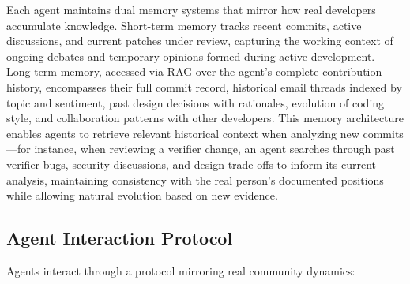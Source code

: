 Each agent maintains dual memory systems that mirror how real developers accumulate knowledge. Short-term memory tracks recent commits, active discussions, and current patches under review, capturing the working context of ongoing debates and temporary opinions formed during active development. Long-term memory, accessed via RAG over the agent's complete contribution history, encompasses their full commit record, historical email threads indexed by topic and sentiment, past design decisions with rationales, evolution of coding style, and collaboration patterns with other developers. This memory architecture enables agents to retrieve relevant historical context when analyzing new commits—for instance, when reviewing a verifier change, an agent searches through past verifier bugs, security discussions, and design trade-offs to inform its current analysis, maintaining consistency with the real person's documented positions while allowing natural evolution based on new evidence.

\subsection{Agent Interaction Protocol}

% 
% 
% 
% 
% 
Agents interact through a protocol mirroring real community dynamics:

